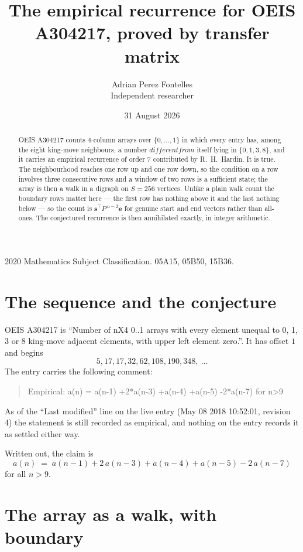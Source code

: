 \documentclass[11pt,a4paper]{article}
\title{The empirical recurrence for OEIS A304217, proved by transfer matrix}
\author{Adrian Perez Fontelles\\ \small Independent researcher}
\date{31 August 2026}
\theoremstyle{plain}
\theoremstyle{definition}
\begin{document}
\maketitle

\begin{abstract}
OEIS A304217 counts $4$-column arrays over $\{0,\dots,1\}$ in which every entry has,
among the eight king-move neighbours, a number $different from$ itself lying in $\{0,1,3,8\}$, and it carries an empirical
recurrence of order $7$ contributed by R.~H.~Hardin. It is true. The neighbourhood
reaches one row up and one row down, so the condition on a row involves three consecutive
rows and a window of two rows is a sufficient state; the array is then a walk in a digraph
on $S=256$ vertices. Unlike a plain walk count the boundary rows matter here --- the first
row has nothing above it and the last nothing below --- so the count is
$\mathbf{s}^{\!\top}P^{\,n-2}\mathbf{e}$ for genuine start and end vectors rather than
all-ones. The conjectured recurrence is then annihilated exactly, in integer arithmetic.
\end{abstract}

\noindent\small 2020 Mathematics Subject Classification. 05A15, 05B50, 15B36.\normalsize

\section{The sequence and the conjecture}

OEIS A304217 is ``Number of nX4 0..1 arrays with every element unequal to 0, 1, 3 or 8 king-move adjacent elements, with upper left element zero.''. It has offset
$1$ and begins
\[
5, 17, 17, 32, 62, 108, 190, 348,\ \dots
\]
The entry carries the following comment:
\begin{quote}\small
Empirical: a(n) = a(n-1) +2*a(n-3) +a(n-4) +a(n-5) -2*a(n-7) for n>9
\end{quote}
As of the ``Last modified'' line on the live entry (May 08 2018 10:52:01, revision
4) the statement is still recorded as empirical, and nothing on the entry
records it as settled either way.

Written out, the claim is
\begin{equation}\label{eq:conj}
a(n)\;=\;a(n-1) + 2\,a(n-3) + a(n-4) + a(n-5) - 2\,a(n-7)
\end{equation}
for all $n>9$.

\section{The array as a walk, with boundary}
\end{document}
